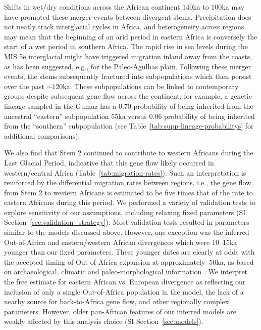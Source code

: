 \documentclass[]{article}
\begin{document}
Shifts in wet/dry conditions across the African continent $140$ka to $100$ka may have
promoted these merger events between divergent stems. 
Precipitation does not neatly track interglacial cycles in Africa,
and heterogeneity across regions may mean that the beginning of an arid period
in eastern Africa is conversely the start of a wet period in
southern Africa\citep{Blome2012-lw}.
The rapid rise in sea levels during the MIS 5e interglacial might have
triggered migration inland away from the
coasts, as has been suggested, e.g., for the Paleo-Agulhas plain\citep{Marean2014-pg}.
Following these merger events, the stems subsequently fractured into
subpopulations which then persist over the past $\sim120$ka. These
subpopulations can be linked to contemporary groups despite subsequent gene
flow across the continent; for example, a genetic lineage sampled in the Gumuz
has a $0.70$ probability of being inherited from the ancestral ``eastern''
subpopulation $55$ka versus $0.06$ probability of being inherited
from the ``southern'' subpopulation (see Table~\ref{tab:supp-lineage-probabilitys} for
additional comparisons). 

We also find that Stem 2 continued to contribute to western Africans during the
Last Glacial Period, indicative that this gene flow likely occurred in
western/central Africa (Table~\ref{tab:migration-rates}). Such an
interpretation is reinforced by the differential migration rates between
regions, i.e., the gene flow from Stem 2 to western Africans is estimated to be
five times that of the rate to eastern Africans during this period. We
performed a variety of validation tests to explore sensitivity of our
assumptions, including relaxing fixed parameters (SI
Section~\ref{sec:validation_strategy}). Most validation tests resulted in
parameters similar to the models discussed above. However, one exception was
the inferred Out-of-Africa and eastern/western African divergences which were
10--15ka younger than our fixed parameters. These younger dates are clearly at 
odds with the accepted timing of Out-of-Africa expansion at approximately $\>50$ka, 
as based on archaeological, climatic and paleo-morphological information
\citep{Fu2014-am,Groucutt2015-do,Prufer2021-ao,Beyer2021-ym}. 
We interpret the free estimate for eastern African vs. European divergence as reflecting 
our inclusion of only a single Out-of-Africa population in the model, the lack of a nearby 
source for back-to-Africa gene flow, and other regionally complex parameters. 
However, older pan-African features of our inferred models are weakly affected by 
this analysis choice (SI Section~\ref{sec:models}).
\end{document}
